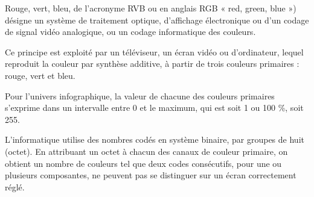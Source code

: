 \documentclass[
  letterpaper,
]{scrbook}
\theoremstyle{definition}
\theoremstyle{definition}
\theoremstyle{plain}
\theoremstyle{remark}
\begin{document}
Rouge, vert, bleu, de l'acronyme RVB ou en anglais RGB « red, green,
blue ») désigne un système de traitement optique, d'affichage
électronique ou d'un codage de signal vidéo analogique, ou un codage
informatique des couleurs.

Ce principe est exploité par un téléviseur, un écran vidéo ou
d'ordinateur, lequel reproduit la couleur par synthèse additive, à
partir de trois couleurs primaires : rouge, vert et bleu.

Pour l'univers infographique, la valeur de chacune des couleurs
primaires s'exprime dans un intervalle entre 0 et le maximum, qui est
soit 1 ou 100 \%, soit 255.

L'informatique utilise des nombres codés en système binaire, par groupes
de huit (octet). En attribuant un octet à chacun des canaux de couleur
primaire, on obtient un nombre de couleurs tel que deux codes
consécutifs, pour une ou plusieurs composantes, ne peuvent pas se
distinguer sur un écran correctement réglé.
\end{document}
